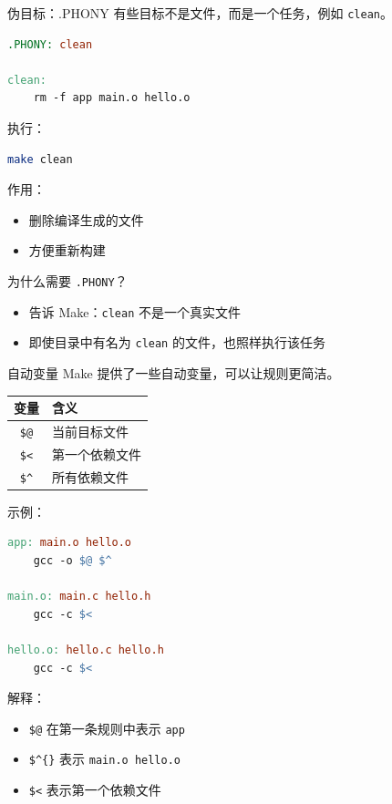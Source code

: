 \documentclass[aspectratio=169]{ctexbeamer}
\begin{document}
\begin{frame}[fragile]{伪目标：.PHONY}
有些目标不是文件，而是一个任务，例如 \texttt{clean}。

\begin{lstlisting}[language=make]
.PHONY: clean

clean:
	rm -f app main.o hello.o
\end{lstlisting}

执行：

\begin{lstlisting}[language=bash]
make clean
\end{lstlisting}

作用：

\begin{itemize}
  \item 删除编译生成的文件
  \item 方便重新构建
\end{itemize}

为什么需要 \texttt{.PHONY}？

\begin{itemize}
  \item 告诉 Make：\texttt{clean} 不是一个真实文件
  \item 即使目录中有名为 \texttt{clean} 的文件，也照样执行该任务
\end{itemize}
\end{frame}


\begin{frame}{自动变量}
Make 提供了一些自动变量，可以让规则更简洁。

\begin{center}
\begin{tabular}{c|l}
\textbf{变量} & \textbf{含义} \\
\hline
\texttt{\$@} & 当前目标文件 \\
\texttt{\$<} & 第一个依赖文件 \\
\texttt{\$\textasciicircum} & 所有依赖文件 \\
\end{tabular}
\end{center}

示例：

\begin{lstlisting}[language=make]
app: main.o hello.o
	gcc -o $@ $^

main.o: main.c hello.h
	gcc -c $<

hello.o: hello.c hello.h
	gcc -c $<
\end{lstlisting}

解释：

\begin{itemize}
  \item \texttt{\$@} 在第一条规则中表示 \texttt{app}
  \item \texttt{\$\textasciicircum\{\}} 表示 \texttt{main.o hello.o}
  \item \texttt{\$<} 表示第一个依赖文件
\end{itemize}
\end{frame}
\end{document}

